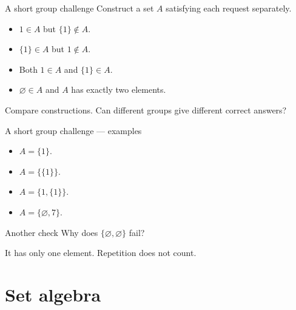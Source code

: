 \documentclass{beamer}
\begin{document}
\begin{frame}{A short group challenge}
Construct a set $A$ satisfying each request separately.\begin{itemize}
\item $1\in A$ but $\{1\}\notin A$.
\item $\{1\}\in A$ but $1\notin A$.
\item Both $1\in A$ and $\{1\}\in A$.
\item $\varnothing\in A$ and $A$ has exactly two elements.
\end{itemize}\medskip Compare constructions. Can different groups give different correct answers?
\end{frame}
\begin{frame}{A short group challenge --- examples}
\begin{itemize}
\item $A=\{1\}$.
\item $A=\{\{1\}\}$.
\item $A=\{1,\{1\}\}$.
\item $A=\{\varnothing,7\}$.
\end{itemize}\begin{block}{Another check}
Why does $\{\varnothing,\varnothing\}$ fail?
\end{block}\medskip It has only one element. Repetition does not count.
\end{frame}
\section{Set algebra}
\end{document}

